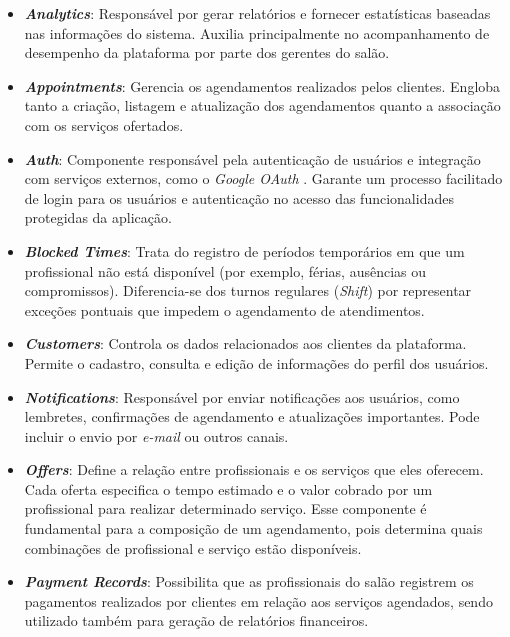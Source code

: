 \begin{itemize}

  \item \textbf{\emph{Analytics}}: Responsável por gerar relatórios e fornecer estatísticas baseadas nas informações do sistema. Auxilia principalmente no acompanhamento de desempenho da plataforma por parte dos gerentes do salão.
  
  \item \textbf{\emph{Appointments}}: Gerencia os agendamentos realizados pelos clientes. Engloba tanto a criação, listagem e atualização dos agendamentos quanto a associação com os serviços ofertados.
  
  \item \textbf{\emph{Auth}}: Componente responsável pela autenticação de usuários e integração com serviços externos, como o \emph{Google OAuth} \cite{GoogleOAuth}. Garante um processo facilitado de login para os usuários e autenticação no acesso das funcionalidades protegidas da aplicação.
  
  \item \textbf{\emph{Blocked Times}}: Trata do registro de períodos temporários em que um profissional não está disponível (por exemplo, férias, ausências ou compromissos). Diferencia-se dos turnos regulares (\emph{Shift}) por representar exceções pontuais que impedem o agendamento de atendimentos.
  
  \item \textbf{\emph{Customers}}: Controla os dados relacionados aos clientes da plataforma. Permite o cadastro, consulta e edição de informações do perfil dos usuários.
  
  \item \textbf{\emph{Notifications}}: Responsável por enviar notificações aos usuários, como lembretes, confirmações de agendamento e atualizações importantes. Pode incluir o envio por \emph{e-mail} ou outros canais.
  
  \item \textbf{\emph{Offers}}: Define a relação entre profissionais e os serviços que eles oferecem. Cada oferta especifica o tempo estimado e o valor cobrado por um profissional para realizar determinado serviço. Esse componente é fundamental para a composição de um agendamento, pois determina quais combinações de profissional e serviço estão disponíveis.
  
  \item \textbf{\emph{Payment Records}}: Possibilita que as profissionais do salão registrem os pagamentos realizados por clientes em relação aos serviços agendados, sendo utilizado também para geração de relatórios financeiros.
  

\end{itemize}
